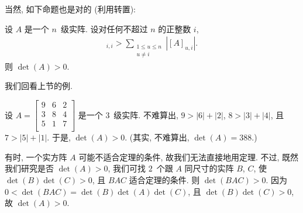 \documentclass[../libro.tex]{subfiles}
\begin{document}

当然, 如下命题也是对的 (利用转置):

\begin{theorem}
    设 \(A\) 是一个 \(n\)~级实阵.
    设对任何不超过 \(n\) 的正整数 \(i\),
    \begin{align*}
        [A]_{i,i} >
        \sum_{\substack{1 \leq u \leq n \\
        u \neq i}} {|[A]_{u,i}|}.
    \end{align*}
    则 \(\det {(A)} > 0\).
\end{theorem}

\begingroup

我们回看上节的例.

\renewcommand\thmcontinues[1]{续}

\begin{example}[continues=emp:NonzeroDet1]
    设 \(A =
        \begin{bmatrix}
            9 & 6 & 2 \\
            3 & 8 & 4 \\
            5 & 1 & 7 \\
    \end{bmatrix}\)
    是一个 \(3\)~级实阵.
    不难算出, \(9 > |6| + |2|\),
    \(8 > |3| + |4|\),
    且 \(7 > |5| + |1|\).
    于是, \(\det {(A)} > 0\).
    (其实, 不难算出, \(\det {(A)} = 388.\))
\end{example}

有时, 一个实方阵 \(A\) 可能不适合定理的条件, 故我们无法直接地用定理.
不过, 既然我们研究是否 \(\det {(A)} > 0\),
我们可找 \(2\)~个跟 \(A\) 同尺寸的实阵 \(B\), \(C\),
使 \(\det {(B)} \det {(C)} > 0\),
且 \(BAC\) 适合定理的条件.
则 \(\det {(BAC)} > 0\).
因为 \(0 < \det {(BAC)} = \det {(B)} \det {(A)} \det {(C)}\),
且 \(\det {(B)} \det {(C)} > 0\),
故 \(\det {(A)} > 0\).
\end{document}
